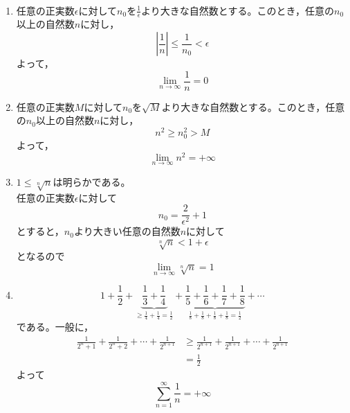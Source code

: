 \documentclass[dvipdfmx,a4j,10pt]{jsarticle}
\makeatletter
\theoremstyle{mystyle1}
\theoremstyle{mystyle2}
\newtheorem{ans}{解答}
\renewenvironment{ans}[1][解答]{\par
  \pushQED{\qed}%
  \normalfont
  \topsep6\p@\@plus6\p@ \trivlist
  \item[\hskip\labelsep{\bfseries\sffamily #1}]\ignorespaces
}{%
  \popQED\endtrivlist\@endpefalse
}
\makeatother
\begin{document}
\begin{ans}[解答\ref{ex1}]\
    \begin{enumerate}
        \item 任意の正実数$\epsilon$に対して$n_0$を$\displaystyle\frac{1}{\epsilon}$より大きな自然数とする。このとき，任意の$n_0$以上の自然数$n$に対し，
        	\[\left|\frac{1}{n}\right|\leq\frac{1}{n_0}<\epsilon\]
        	よって，
        	\[\lim_{n\to\infty}\frac{1}{n}=0\]
        \item 任意の正実数$M$に対して$n_0$を$\sqrt{M}$より大きな自然数とする。このとき，任意の$n_0$以上の自然数$n$に対し，
        	\[n^2\geq n_0^2>M\]
        	よって，
        	\[\lim_{n\to\infty}n^2=+\infty\]
        \item $1\leq\sqrt[n]{n}$は明らかである。\\
        	任意の正実数$\epsilon$に対して
        	\[n_0=\frac{2}{\epsilon^2}+1\]
        	とする\footnotemark  と，$n_0$より大きい任意の自然数$n$に対して
        	\[\sqrt[n]{n}<1+\epsilon\]
        	となるので
        	\[\lim_{n\to\infty}\sqrt[n]{n}=1\]
        \item \[1+\frac{1}{2}+\underbrace{\frac{1}{3}+\frac{1}{4}}_{\geq\frac{1}{4}+\frac{1}{4}=\frac{1}{2}}+\underbrace{\frac{1}{5}+\frac{1}{6}+\frac{1}{7}+\frac{1}{8}}_{\frac{1}{8}+\frac{1}{8}+\frac{1}{8}+\frac{1}{8}=\frac{1}{2}}+\cdots\]
        	である。一般に，
        	\[
        	\begin{split}
        		\frac{1}{2^n+1}+\frac{1}{2^n+2}+\cdots+\frac{1}{2^{n+1}}
        		&\geq \frac{1}{2^{n+1}}+\frac{1}{2^{n+1}}+\cdots+\frac{1}{2^{n+1}}\\
        		&=\frac{1}{2}
        	\end{split}
        	\]
        	よって
        	\[\sum_{n=1}^{\infty}\frac{1}{n}=+\infty\]
    \end{enumerate}
\end{ans}
\end{document}
